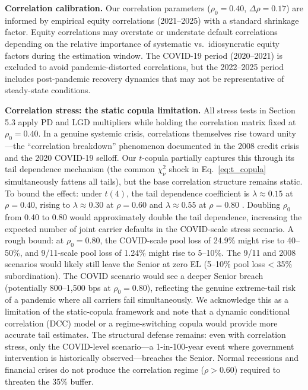 \documentclass[12pt,a4paper]{article}
\begin{document}
\textbf{Correlation calibration.} Our correlation parameters ($\rho_0 = 0.40$, $\Delta\rho = 0.17$) are informed by empirical equity correlations (2021--2025) with a standard shrinkage factor. Equity correlations may overstate or understate default correlations depending on the relative importance of systematic vs.\ idiosyncratic equity factors during the estimation window. The COVID-19 period (2020--2021) is excluded to avoid pandemic-distorted correlations, but the 2022--2025 period includes post-pandemic recovery dynamics that may not be representative of steady-state conditions.

\textbf{Correlation stress: the static copula limitation.} All stress tests in Section 5.3 apply PD and LGD multipliers while holding the correlation matrix fixed at $\rho_0 = 0.40$. In a genuine systemic crisis, correlations themselves rise toward unity---the ``correlation breakdown'' phenomenon documented in the 2008 credit crisis and the 2020 COVID-19 selloff. Our $t$-copula partially captures this through its tail dependence mechanism (the common $\chi^2_\nu$ shock in Eq.~\ref{eq:t_copula} simultaneously fattens all tails), but the base correlation structure remains static. To bound the effect: under $t(4)$, the tail dependence coefficient is $\lambda \approx 0.15$ at $\rho = 0.40$, rising to $\lambda \approx 0.30$ at $\rho = 0.60$ and $\lambda \approx 0.55$ at $\rho = 0.80$ \cite{demarta2005}. Doubling $\rho_0$ from 0.40 to 0.80 would approximately double the tail dependence, increasing the expected number of joint carrier defaults in the COVID-scale stress scenario. A rough bound: at $\rho_0 = 0.80$, the COVID-scale pool loss of 24.9\% might rise to 40--50\%, and 9/11-scale pool loss of 1.24\% might rise to 5--10\%. The 9/11 and 2008 scenarios would likely still leave the Senior at zero EL (5--10\% pool loss < 35\% subordination). The COVID scenario would see a deeper Senior breach (potentially 800--1,500 bps at $\rho_0 = 0.80$), reflecting the genuine extreme-tail risk of a pandemic where all carriers fail simultaneously. We acknowledge this as a limitation of the static-copula framework and note that a dynamic conditional correlation (DCC) model or a regime-switching copula would provide more accurate tail estimates. The structural defense remains: even with correlation stress, only the COVID-level scenario---a 1-in-100-year event where government intervention is historically observed---breaches the Senior. Normal recessions and financial crises do not produce the correlation regime ($\rho > 0.60$) required to threaten the 35\% buffer.
\end{document}
